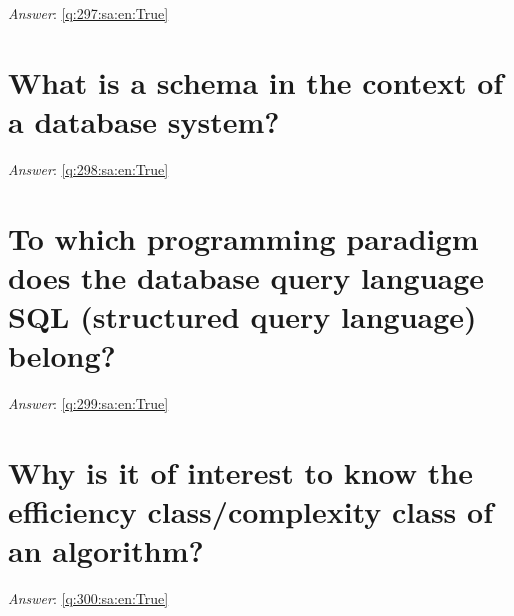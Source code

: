 \documentclass[a4paper,11pt,oneside]{book}
\begin{document}
\begin{sloppypar}
\vspace{2cm}

\noindent\makebox[\textwidth]{\hrulefill}

\vspace{1cm}

\textit{Answer}: \autoref{q:297:sa:en:True}



\section{What is a schema in the context of a database system?}

\label{q:298:sa:en:False}

\vspace{2cm}

\noindent\makebox[\textwidth]{\hrulefill}

\vspace{1cm}

\textit{Answer}: \autoref{q:298:sa:en:True}



\section{To which programming paradigm does the database query language SQL (structured query language) belong?}

\label{q:299:sa:en:False}

\vspace{2cm}

\noindent\makebox[\textwidth]{\hrulefill}

\vspace{1cm}

\textit{Answer}: \autoref{q:299:sa:en:True}



\section{Why is it of interest to know the efficiency class/complexity class of an algorithm?}

\label{q:300:sa:en:False}

\vspace{2cm}

\noindent\makebox[\textwidth]{\hrulefill}

\vspace{1cm}

\textit{Answer}: \autoref{q:300:sa:en:True}




\end{sloppypar}
\end{document}
